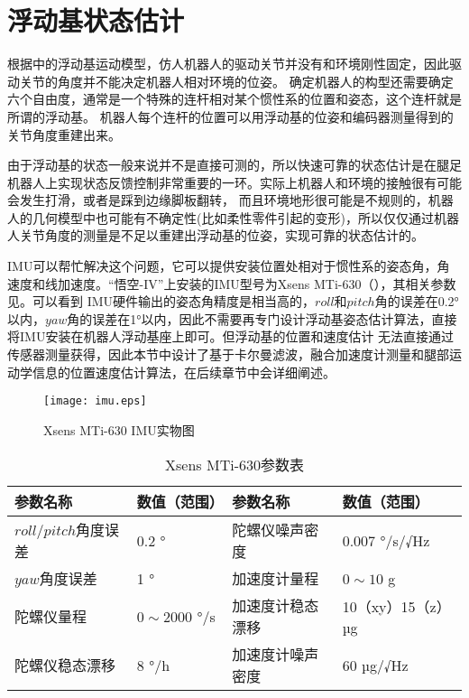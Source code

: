 \section{浮动基状态估计}
\label{sec:com_est}
根据中的浮动基运动模型，仿人机器人的驱动关节并没有和环境刚性固定，因此驱动关节的角度并不能决定机器人相对环境的位姿。
确定机器人的构型还需要确定六个自由度，通常是一个特殊的连杆相对某个惯性系的位置和姿态，这个连杆就是所谓的浮动基。
机器人每个连杆的位置可以用浮动基的位姿和编码器测量得到的关节角度重建出来。

由于浮动基的状态一般来说并不是直接可测的，所以快速可靠的状态估计是在腿足机器人上实现状态反馈控制非常重要的一环。实际上机器人和环境的接触很有可能会发生打滑，或者是踩到边缘脚板翻转，
而且环境地形很可能是不规则的，机器人的几何模型中也可能有不确定性(比如柔性零件引起的变形)，所以仅仅通过机器人关节角度的测量是不足以重建出浮动基的位姿，实现可靠的状态估计的。

IMU可以帮忙解决这个问题，它可以提供安装位置处相对于惯性系的姿态角，角速度和线加速度。“悟空-IV”上安装的IMU型号为Xsens MTi-630（），其相关参数见。可以看到
IMU硬件输出的姿态角精度是相当高的，$roll$和$pitch$角的误差在0.2°以内，$yaw$角的误差在1°以内，因此不需要再专门设计浮动基姿态估计算法，直接将IMU安装在机器人浮动基座上即可。但浮动基的位置和速度估计
无法直接通过传感器测量获得，因此本节中设计了基于卡尔曼滤波，融合加速度计测量和腿部运动学信息的位置速度估计算法，在后续章节中会详细阐述。
\begin{figure}[h]
    \centering
    \texttt{[image: imu.eps]}
    \caption{\label{fig:imu}Xsens MTi-630 IMU实物图}
\end{figure}
\begin{table}[h]
	\centering
	\caption{Xsens MTi-630参数表}
	\label{tab:imu_data}
	\begin{tabular}{m{4cm}<{\centering}m{2.5cm}<{\centering}m{4cm}<{\centering}m{4cm}<{\centering}}
		\toprule  %
		参数名称   &数值（范围） & 参数名称 &数值（范围）  \\
		\midrule  %
		$roll/pitch$角度误差    & 0.2 ° & 陀螺仪噪声密度 & 0.007 °/s/√Hz \\
		$yaw$角度误差 &  1 ° & 加速度计量程 & $0\sim10$ g\\
		陀螺仪量程 & $0\sim2000$ °/s & 加速度计稳态漂移 & 10（xy）15（z） µg \\
        陀螺仪稳态漂移 & 8 °/h & 加速度计噪声密度 & 60 µg/√Hz\\
		\bottomrule %
	\end{tabular}
\end{table}

